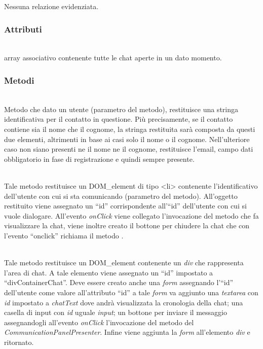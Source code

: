 Nessuna relazione evidenziata.

\subsubsection*{Attributi}
\begin{description}
\item{}\\
  array associativo contenente tutte le chat aperte in un dato momento.
\end{description}

\subsubsection*{Metodi}
\begin{description}
\item{}\\
	Metodo che dato un utente (parametro del metodo), restituisce una stringa identificativa per il contatto in questione. Più precisamente, se il contatto contiene sia il nome che il cognome, la stringa restituita sarà composta da questi due elementi, altrimenti in base ai casi solo il nome o il cognome. Nell'ulteriore caso non siano presenti ne il nome ne il cognome, restituisce l'email, campo dati obbligatorio in fase di registrazione e quindi sempre presente.

\item{}\\
	Tale metodo restituisce un DOM\_element di tipo <li> contenente l'identificativo dell'utente con cui si sta comunicando (parametro del metodo). All'oggetto restituito viene assegnato un ``id'' corrispondente all'``id'' dell'utente con cui si vuole dialogare. All'evento \textit{onClick} viene collegato l'invocazione del metodo  che fa visualizzare la chat, viene inoltre creato il bottone per chiudere la chat che con l'evento ``onclick'' richiama il metodo .

\item{}\\
	Tale metodo restituisce un DOM\_element contenente un \textit{div} che rappresenta l'area di chat. A tale elemento viene assegnato un ``id'' impostato a ``divContainerChat''. Deve essere creato anche una \textit{form} assegnando l'``id'' dell'utente come valore all'attributo ``id'' a tale \textit{form} va aggiunto una \textit{textarea} con \textit{id} impostato a \textit{chatText} dove andrà visualizzata la cronologia della chat; una casella di input con \textit{id} uguale \textit{input}; un bottone per inviare il messaggio assegnandogli all'evento \textit{onClick} l'invocazione del metodo  del \textit{CommunicationPanelPresenter}. Infine viene aggiunta la \textit{form} all'elemento \textit{div} e ritornato.
	

\end{description}
